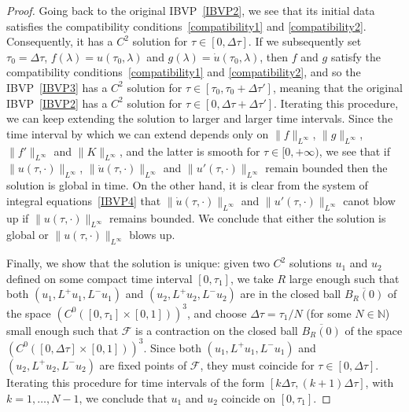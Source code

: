 \documentclass[10pt]{amsart}
\newcommand{\cF}{\mathcal{F}}
\newcommand{\bbN}{\mathbb{N}}      %
\begin{document}
\begin{proof}
Going back to the original IBVP~\eqref{IBVP2}, we see that its initial data satisfies the compatibility conditions~\eqref{compatibility1} and \eqref{compatibility2}. Consequently, it has a $C^2$ solution for $\tau \in [0, \Delta \tau]$. If we subsequently set $\tau_0 = \Delta \tau$, $f(\lambda)=u(\tau_0,\lambda)$ and $g(\lambda)=\dot{u}(\tau_0,\lambda)$, then $f$ and $g$ satisfy the compatibility conditions~\eqref{compatibility1} and \eqref{compatibility2}, and so the IBVP~\eqref{IBVP3} has a $C^2$ solution for $\tau \in [\tau_0, \tau_0 + \Delta \tau']$, meaning that the original IBVP~\eqref{IBVP2} has a $C^2$ solution for $\tau \in [0, \Delta \tau + \Delta \tau']$. Iterating this procedure, we can keep extending the solution to larger and larger time intervals. Since the time interval by which we can extend depends only on $\| f \|_{L^\infty}$, $\| g \|_{L^\infty}$, $\| f' \|_{L^\infty}$ and $\| K \|_{L^\infty}$, and the latter is smooth for $\tau \in [0, +\infty)$, we see that if $\| u(\tau, \cdot) \|_{L^\infty}$, $\| \dot{u}(\tau, \cdot) \|_{L^\infty}$ and $\| u'(\tau, \cdot) \|_{L^\infty}$ remain bounded then the solution is global in time. On the other hand, it is clear from the system of integral equations~\eqref{IBVP4} that $\| \dot{u}(\tau, \cdot) \|_{L^\infty}$ and $\| u'(\tau, \cdot) \|_{L^\infty}$ canot blow up if $\| u(\tau, \cdot) \|_{L^\infty}$ remains bounded. We conclude that either the solution is global or $\| u(\tau, \cdot) \|_{L^\infty}$ blows up.

Finally, we show that the solution is unique: given two $C^2$ solutions $u_1$ and $u_2$ defined on some compact time interval $[0, \tau_1]$, we take $R$ large enough such that both $(u_1,L^+{u}_1,L^-u_1)$ and $(u_2,L^+u_2,L^-u_2)$ are in the closed ball $\overline{B_R(0)}$ of the space $\left(C^0\left([0, \tau_1] \times [0,1]\right)\right)^3$, and choose $\Delta \tau = \tau_1 / N$ (for some $N \in \bbN$) small enough such that $\cF$ is a contraction on the closed ball $\overline{B_R(0)}$ of the space $\left(C^0\left([0,\Delta \tau] \times [0,1]\right)\right)^3$. Since both $(u_1,L^+{u}_1,L^-u_1)$ and $(u_2,L^+u_2,L^-u_2)$ are fixed points of $\cF$, they must coincide for $\tau \in [0,\Delta \tau]$. Iterating this procedure for time intervals of the form $[ k \Delta \tau, (k + 1) \Delta\tau]$, with $k = 1, \ldots, N-1$, we conclude that $u_1$ and $u_2$ coincide on $[0, \tau_1]$. 
\end{proof}
\end{document}
